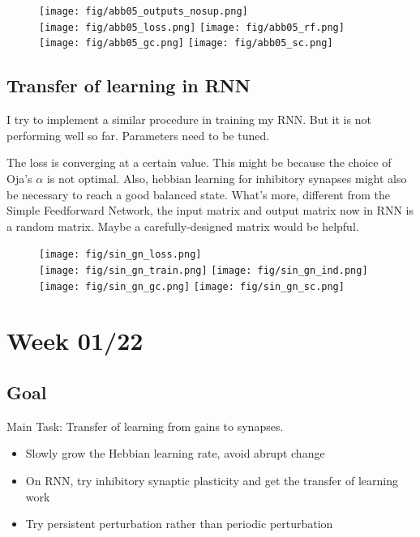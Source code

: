 \documentclass[12pt, a4paper]{article}
\begin{document}
\begin{figure}[H]
    \centering
    \texttt{[image: fig/abb05\_outputs\_nosup.png]} \\
    \texttt{[image: fig/abb05\_loss.png]}
    \texttt{[image: fig/abb05\_rf.png]}
    \texttt{[image: fig/abb05\_gc.png]}
    \texttt{[image: fig/abb05\_sc.png]}
    \label{fig:1}
\end{figure}

\newpage

\subsection*{Transfer of learning in RNN}

I try to implement a similar procedure in training my RNN. But it is not performing well so far. Parameters need to be tuned.

The loss is converging at a certain value. This might be because the choice of Oja's $\alpha$ is not optimal. Also, hebbian learning for inhibitory synapses might also be necessary to reach a good balanced state. What's more, different from the Simple Feedforward Network, the input matrix and output matrix now in RNN is a random matrix. Maybe a carefully-designed matrix would be helpful.

\begin{figure}[H]
    \centering
    \texttt{[image: fig/sin\_gn\_loss.png]} \\
    \texttt{[image: fig/sin\_gn\_train.png]}
    \texttt{[image: fig/sin\_gn\_ind.png]}
    \texttt{[image: fig/sin\_gn\_gc.png]}
    \texttt{[image: fig/sin\_gn\_sc.png]}
    \label{fig:1}
\end{figure}

\newpage


\section*{Week 01/22}

\subsection*{Goal}

\noindent
Main Task: Transfer of learning from gains to synapses.

\begin{itemize}
    \item Slowly grow the Hebbian learning rate, avoid abrupt change
    \item On RNN, try inhibitory synaptic plasticity and get the transfer of learning work
    \item Try persistent perturbation rather than periodic perturbation
\end{itemize}
\end{document}
